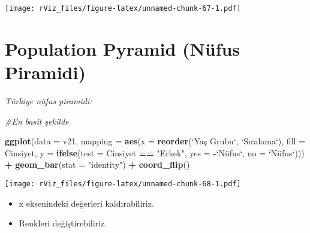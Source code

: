 \documentclass[
]{book}
\newenvironment{Shaded}{\begin{snugshade}}{\end{snugshade}}
\newcommand{\CommentTok}[1]{\textcolor[rgb]{0.56,0.35,0.01}{\textit{#1}}}
\newcommand{\DataTypeTok}[1]{\textcolor[rgb]{0.13,0.29,0.53}{#1}}
\newcommand{\KeywordTok}[1]{\textcolor[rgb]{0.13,0.29,0.53}{\textbf{#1}}}
\newcommand{\NormalTok}[1]{#1}
\newcommand{\OperatorTok}[1]{\textcolor[rgb]{0.81,0.36,0.00}{\textbf{#1}}}
\newcommand{\StringTok}[1]{\textcolor[rgb]{0.31,0.60,0.02}{#1}}
\begin{document}
\texttt{[image: rViz\_files/figure-latex/unnamed-chunk-67-1.pdf]}

\hypertarget{population-pyramid-nuxfcfus-piramidi}{%
\section{Population Pyramid (Nüfus Piramidi)}\label{population-pyramid-nuxfcfus-piramidi}}

\emph{Türkiye nüfus piramidi:}

\begin{Shaded}
\begin{Highlighting}[]
\CommentTok{#En basit şekilde}

\KeywordTok{ggplot}\NormalTok{(}\DataTypeTok{data =}\NormalTok{ v21,}
       \DataTypeTok{mapping =} \KeywordTok{aes}\NormalTok{(}\DataTypeTok{x =} \KeywordTok{reorder}\NormalTok{(}\StringTok{`}\DataTypeTok{Yaş Grubu}\StringTok{`}\NormalTok{, }\StringTok{`}\DataTypeTok{Sıralama}\StringTok{`}\NormalTok{), }\DataTypeTok{fill =}\NormalTok{ Cinsiyet,}
                     \DataTypeTok{y =} \KeywordTok{ifelse}\NormalTok{(}\DataTypeTok{test =}\NormalTok{ Cinsiyet }\OperatorTok{==}\StringTok{ "Erkek"}\NormalTok{, }\DataTypeTok{yes =} \OperatorTok{-}\StringTok{`}\DataTypeTok{Nüfus`, no = }\StringTok{`}\NormalTok{Nüfus`))) }\OperatorTok{+}\StringTok{ }
\StringTok{  }\KeywordTok{geom_bar}\NormalTok{(}\DataTypeTok{stat =} \StringTok{"identity"}\NormalTok{) }\OperatorTok{+}
\StringTok{  }\KeywordTok{coord_flip}\NormalTok{()}
\end{Highlighting}
\end{Shaded}

\texttt{[image: rViz\_files/figure-latex/unnamed-chunk-68-1.pdf]}

\begin{itemize}
\item
  x eksenindeki değerleri kaldırabiliriz.
\item
  Renkleri değiştirebiliriz.
\end{itemize}
\end{document}
